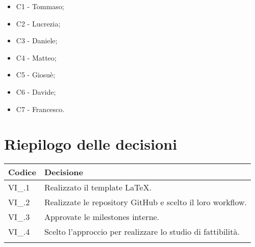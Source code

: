 \begin{itemize}

	\item C1 - Tommaso;
	\item C2 - Lucrezia;
	\item C3 - Daniele;
	\item C4 - Matteo;
	\item C5 - Giosuè;
	\item C6 - Davide;
	\item C7 - Francesco.
\end{itemize}

\newpage

\section{Riepilogo delle decisioni \hfil}
{
	\setlength{\freewidth}{\dimexpr\textwidth-4\tabcolsep}
	\renewcommand{\arraystretch}{1.5}
	\setlength{\aboverulesep}{0pt}
	\setlength{\belowrulesep}{0pt}
	\begin{longtable}{L{.3\freewidth} L{.7\freewidth}}
		\toprule 
		\textbf{Codice} & \textbf{Decisione}\\
		\toprule
		\endhead
		
		VI\_\DataMeeting{}.1 & Realizzato il template \LaTeX. \\  
		VI\_\DataMeeting{}.2 & Realizzate le repository GitHub e scelto il loro workflow. \\ 
		VI\_\DataMeeting{}.3 & Approvate le milestones interne. \\
		VI\_\DataMeeting{}.4 & Scelto l'approccio per realizzare lo studio di fattibilità. \\  		
		
		\bottomrule
		\hiderowcolors
	\end{longtable}
}